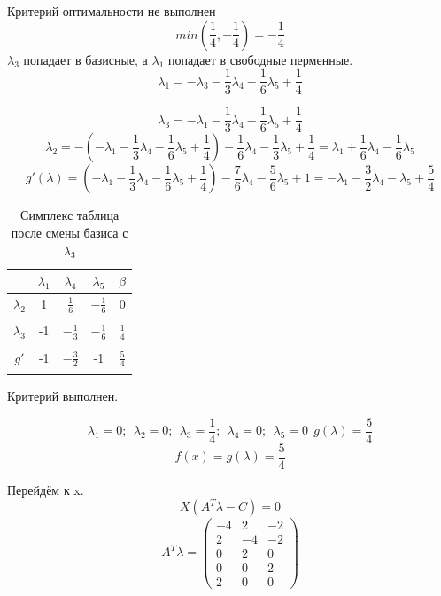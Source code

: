 \documentclass{article}
\begin{document}
Критерий оптимальности не выполнен 
\[min(\frac{1}{4}, -\frac{1}{4}) = -\frac{1}{4}\]
$\lambda_3$ попадает в базисные, а $\lambda_1$ попадает в свободные перменные.
\[\lambda_1 = -\lambda_3 - \frac{1}{3}\lambda_4 - \frac{1}{6}\lambda_5 + \frac{1}{4}\]

\[\lambda_3 = -\lambda_1-\frac{1}{3}\lambda_4-\frac{1}{6}\lambda_5+\frac{1}{4}\]
\[\lambda_2 = -(-\lambda_1-\frac{1}{3}\lambda_4-\frac{1}{6}\lambda_5+\frac{1}{4}) - \frac{1}{6}\lambda_4 - \frac{1}{3}\lambda_5 +\frac{1}{4} =
\lambda_1 + \frac{1}{6}\lambda_4-\frac{1}{6}\lambda_5\]
\[g'(\lambda) = (-\lambda_1-\frac{1}{3}\lambda_4-\frac{1}{6}\lambda_5+\frac{1}{4}) - \frac{7}{6}\lambda_4 - \frac{5}{6}\lambda_5 +1 = 
-\lambda_1 - \frac{3}{2}\lambda_4 - \lambda_5+\frac{5}{4}\]

\begin{table}[H]
    \centering
    \caption{Симплекс таблица после смены базиса с $\lambda_3$}
    \begin{tabular}{|c|c|c|c|c|}
    \hline
    &$\lambda_1$&$\lambda_4$&$\lambda_5$&$\beta$\\\hline
    $\lambda_2$&1&$\frac{1}{6}$&$-\frac{1}{6}$&$0$\\
    &&&&\\\hline
    $\lambda_3$&-1&$-\frac{1}{3}$&$-\frac{1}{6}$&$\frac{1}{4}$\\
    &&&&\\\hline
    $g'$&-1&$-\frac{3}{2}$&-1&$\frac{5}{4}$\\
    &&&&\\\hline
    \end{tabular}
\end{table}
Критерий выполнен.

\[\lambda_1 = 0;\ \ \lambda_2 = 0;\ \ \lambda_3 = \frac{1}{4};\ \ \lambda_4 = 0;\ \ \lambda_5 = 0 \ \ g(\lambda) = \frac{5}{4}\]
\[f(x) = g(\lambda) = \frac{5}{4}\]



Перейдём к x.
\[X(A^T\lambda - C) = 0\]
\[A^T\lambda = \begin{pmatrix}
    -4&2&-2\\
    2&-4&-2\\
    0&2&0\\
    0&0&2\\
    2&0&0
\end{pmatrix} \]
\end{document}
